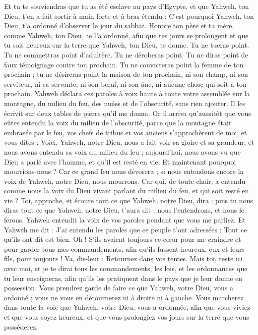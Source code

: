 \begin{multicols}{2}
Et tu te souviendras que tu as été esclave au pays d'Egypte, et que Yahweh, ton Dieu, t'en a fait sortir à main forte et à bras étendu : C'est pourquoi Yahweh, ton Dieu, t'a ordonné d’observer le jour du sabbat.
Honore ton père et ta mère, comme Yahweh, ton Dieu, te l'a ordonné, afin que tes jours se prolongent et que tu sois heureux sur la terre que Yahweh, ton Dieu, te donne.
Tu ne tueras point.
Tu ne commettras point d’adultère.
Tu ne déroberas point.
Tu ne diras point de faux témoignage contre ton prochain.
Tu ne convoiteras point la femme de ton prochain ; tu ne désireras point la maison de ton prochain, ni son champ, ni son serviteur, ni sa servante, ni son bœuf, ni son âne, ni aucune chose qui soit à ton prochain.
Yahweh déclara ces paroles à voix haute à toute votre assemblée sur la montagne, du milieu du feu, des nuées et de l'obscurité, sans rien ajouter. Il les écrivit sur deux tables de pierre qu'il me donna.
Or il arriva qu’aussitôt que vous eûtes entendu la voix du milieu de l'obscurité, parce que la montagne était embrasée par le feu, vos chefs de tribus et vos anciens s’approchèrent de moi,
et vous dîtes : Voici, Yahweh, notre Dieu, nous a fait voir sa gloire et sa grandeur, et nous avons entendu sa voix du milieu du feu ; aujourd'hui, nous avons vu que Dieu a parlé avec l'homme, et qu’il est resté en vie.
Et maintenant pourquoi mourrions-nous ? Car ce grand feu nous dévorera ; si nous entendons encore la voix de Yahweh, notre Dieu, nous mourrons.
Car qui, de toute chair, a entendu comme nous la voix du Dieu vivant parlant du milieu du feu, et qui soit resté en vie ?
Toi, approche, et écoute tout ce que Yahweh, notre Dieu, dira ; puis tu nous diras tout ce que Yahweh, notre Dieu, t'aura dit ; nous l'entendrons, et nous le ferons.
Yahweh entendit la voix de vos paroles pendant que vous me parliez. Et Yahweh me dit : J'ai entendu les paroles que ce peuple t'ont adressées : Tout ce qu’ils ont dit est bien.
Oh ! S’ils avaient toujours ce cœur pour me craindre et pour garder tous mes commandements, afin qu'ils fussent heureux, eux et leurs fils, pour toujours !
Va, dis-leur : Retournez dans vos tentes.
Mais toi, reste ici avec moi, et je te dirai tous les commandements, les lois, et les ordonnances que tu leur enseigneras, afin qu'ils les pratiquent dans le pays que je leur donne en possession.
Vous prendrez garde de faire ce que Yahweh, votre Dieu, vous a ordonné ; vous ne vous en détournerez ni à droite ni à gauche.
Vous marcherez dans toute la voie que Yahweh, votre Dieu, vous a ordonnée, afin que vous viviez et que vous soyez heureux, et que vous prolongiez vos jours sur la terre que vous posséderez.

\end{multicols}
